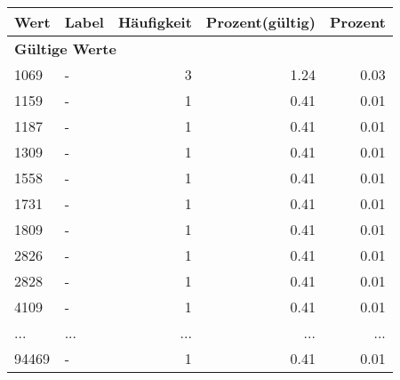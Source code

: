      \begin{longtable}{lXrrr}
     \toprule
     \textbf{Wert} & \textbf{Label} & \textbf{Häufigkeit} & \textbf{Prozent(gültig)} & \textbf{Prozent} \\
     \endhead
     \midrule
     \multicolumn{5}{l}{\textbf{Gültige Werte}}\\
        1069 & \multicolumn{1}{X}{-} & %
          \num{3} &
          \num[round-mode=places,round-precision=2]{1,24} &
          \num[round-mode=places,round-precision=2]{0,03} \\
        1159 & \multicolumn{1}{X}{-} & %
          \num{1} &
          \num[round-mode=places,round-precision=2]{0,41} &
          \num[round-mode=places,round-precision=2]{0,01} \\
        1187 & \multicolumn{1}{X}{-} & %
          \num{1} &
          \num[round-mode=places,round-precision=2]{0,41} &
          \num[round-mode=places,round-precision=2]{0,01} \\
        1309 & \multicolumn{1}{X}{-} & %
          \num{1} &
          \num[round-mode=places,round-precision=2]{0,41} &
          \num[round-mode=places,round-precision=2]{0,01} \\
        1558 & \multicolumn{1}{X}{-} & %
          \num{1} &
          \num[round-mode=places,round-precision=2]{0,41} &
          \num[round-mode=places,round-precision=2]{0,01} \\
        1731 & \multicolumn{1}{X}{-} & %
          \num{1} &
          \num[round-mode=places,round-precision=2]{0,41} &
          \num[round-mode=places,round-precision=2]{0,01} \\
        1809 & \multicolumn{1}{X}{-} & %
          \num{1} &
          \num[round-mode=places,round-precision=2]{0,41} &
          \num[round-mode=places,round-precision=2]{0,01} \\
        2826 & \multicolumn{1}{X}{-} & %
          \num{1} &
          \num[round-mode=places,round-precision=2]{0,41} &
          \num[round-mode=places,round-precision=2]{0,01} \\
        2828 & \multicolumn{1}{X}{-} & %
          \num{1} &
          \num[round-mode=places,round-precision=2]{0,41} &
          \num[round-mode=places,round-precision=2]{0,01} \\
        4109 & \multicolumn{1}{X}{-} & %
          \num{1} &
          \num[round-mode=places,round-precision=2]{0,41} &
          \num[round-mode=places,round-precision=2]{0,01} \\
       ... & ... & ... & ... & ... \\
        94469 & \multicolumn{1}{X}{-} & %
          \num{1} &
          \num[round-mode=places,round-precision=2]{0,41} &
          \num[round-mode=places,round-precision=2]{0,01} \\


\end{longtable}
